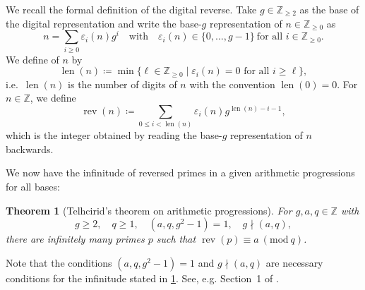 \documentclass[hidelinks]{amsart}
\numberwithin{equation}{section}
\theoremstyle{plain}
\newtheorem{theorem}{Theorem}
\theoremstyle{definition}
\let\tmp\phi
\let\phi\varphi
\let\varphi\tmp
\let\tmp\epsilon
\let\epsilon\varepsilon
\let\varepsilon\tmp
\renewcommand{\mod}[1]{(\mathrm{mod}\ #1)}
\DeclareMathOperator{\rev}{rev}
\DeclareMathOperator{\len}{len}
\begin{document}
We recall the formal definition of the digital reverse.
Take $g\in\mathbb{Z}_{\ge2}$ as the base of the digital representation
and write the base-$g$ representation of $n\in\mathbb{Z}_{\ge0}$ as
\begin{equation}
\label{sec:intro:base_g_representation}
n
=
\sum_{i\ge0}\epsilon_{i}(n)g^{i}
\quad\text{with}\quad
\epsilon_{i}(n)\in\{0,\ldots,g-1\}\ \text{for all $i\in\mathbb{Z}_{\ge0}$}.
\end{equation}
We define \text{the length $\len(n)$} of $n$ by
\[
\len(n)
\coloneqq
\min\{\ell\in\mathbb{Z}_{\ge0}\mid\text{$\epsilon_{i}(n)=0$ for all $i\ge\ell$}\},
\]
i.e.\ $\len(n)$ is the number of digits of $n$
with the convention $\len(0)=0$.
For $n\in\mathbb{Z}$, we define
\begin{equation}
\label{sec:intro:def:abs_digital_reverse}
\rev(n)
\coloneqq
\sum_{0\le i<\len(n)}\epsilon_{i}(n)g^{\len(n)-i-1},
\end{equation}
which is the integer obtained by reading the base-$g$ representation of $n$ backwards.

We now have the infinitude of reversed primes
in a given arithmetic progressions for all bases:
\begin{theorem}[Telhcirid's theorem on arithmetic progressions]
\label{thm:Telhcirid}
For $g,a,q\in\mathbb{Z}$ with
\[
g\ge2,\quad
q\ge1,\quad
(a,q,g^{2}-1)=1,\quad
g\nmid(a,q),
\]
there are infinitely many primes $p$ such that $\rev(p)\equiv a\ \mod{q}$.
\end{theorem}

Note that the conditions $(a,q,g^{2}-1)=1$ and $g\nmid(a,q)$ are necessary conditions
for the infinitude stated in \cref{thm:Telhcirid}. See, e.g. Section~1 of \cite{BhowmikSuzuki:Telhcirid}.
\end{document}
